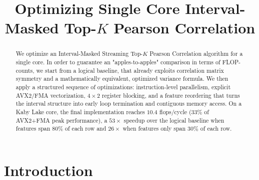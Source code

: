 \documentclass[letterpaper]{article}
\title{Optimizing Single Core Interval-Masked Top-$K$ Pearson Correlation}
\begin{document}
%
\maketitle
%


\begin{abstract}
We optimize an Interval-Masked Streaming Top-$K$ Pearson Correlation algorithm for a single core. In order to guarantee an "apples-to-apples" comparison in terms of FLOP-counts, we start from a logical baseline, that already exploits correlation matrix symmetry and a mathematically equivalent, optimized variance formula. We then apply a structured sequence of optimizations: instruction-level parallelism, explicit AVX2/FMA vectorization, $4\times2$ register blocking, and a feature reordering that turns the interval structure into early loop termination and contiguous memory access. On a Kaby Lake core, the final implementation reaches $10.4$ flops/cycle ($33\%$ of AVX2+FMA peak performance), a $53\times$ speedup over the logical baseline when features span $80\%$ of each row and $26\times$ when features only span $30\%$ of each row.
\end{abstract}

\section{Introduction}\label{sec:intro}


\end{document}

